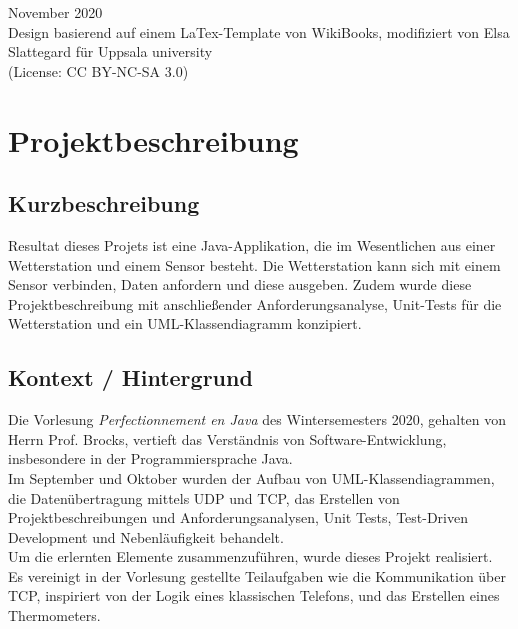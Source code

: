 \documentclass[a4paper]{report}
\begin{document}
\begin{titlepage}

{\large November 2020}\\[2cm] %
{\large Design basierend auf einem LaTex-Template von WikiBooks, modifiziert von Elsa Slattegard 
für Uppsala university \\(License: CC BY-NC-SA 3.0)}\\[1.8cm]

\vfill %

\end{titlepage}


\chapter{Projektbeschreibung}
\section{Kurzbeschreibung}
Resultat dieses Projets ist eine Java-Applikation, die im Wesentlichen aus einer Wetterstation und einem Sensor besteht.
Die Wetterstation kann sich mit einem Sensor verbinden, Daten anfordern und diese ausgeben. Zudem wurde diese Projektbeschreibung 
mit anschließender Anforderungsanalyse, Unit-Tests für die Wetterstation und ein UML-Klassendiagramm konzipiert.\\
\section{Kontext / Hintergrund}
Die Vorlesung \textit{Perfectionnement en Java} des Wintersemesters 2020, gehalten von Herrn Prof. Brocks, 
vertieft das Verständnis von Software-Entwicklung, insbesondere in der Programmiersprache Java. \\
Im September und Oktober wurden der Aufbau von UML-Klassendiagrammen, die Datenübertragung mittels UDP 
und TCP, das Erstellen von Projektbeschreibungen und Anforderungsanalysen, Unit Tests, Test-Driven 
Development und Nebenläufigkeit behandelt.\\
Um die erlernten Elemente zusammenzuführen, wurde dieses Projekt realisiert. Es vereinigt in der Vorlesung gestellte
Teilaufgaben wie die Kommunikation über TCP, inspiriert von der Logik eines klassischen Telefons, und das Erstellen
eines Thermometers.\\
\end{document}
